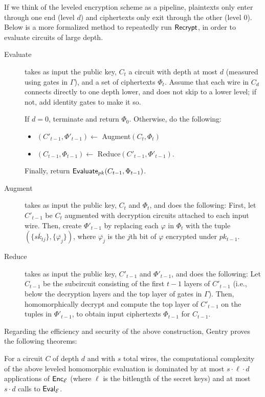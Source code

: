 If we think of the leveled encryption scheme as a pipeline, plaintexts only enter through one end (level $d$) and ciphertexts only exit through the other (level $0$). Below is a more formalized method to repeatedly run ${\sf Recrypt}$, in order to evaluate circuits of large depth.

\begin{description}
\item[Evaluate] takes as input the public key, $C_t$ a circuit with depth at most $d$ (measured using gates in $\Gamma$), and a set of ciphertexts $\Phi_t$. Assume that each wire in $C_d$ connects directly to one depth lower, and does not skip to a lower level; if not, add identity gates to make it so.

If $d=0$, terminate and return $\Phi_0$. Otherwise, do the following:
\begin{itemize}
\item $(C'_{t-1}, \Phi'_{t-1}) \leftarrow$ Augment$(C_t, \Phi_t)$
\item $(C_{t-1}, \Phi_{t-1}) \leftarrow$ Reduce$(C'_{t-1}, \Phi'_{t-1})$.
\end{itemize}

Finally, return ${\sf Evaluate}_{pk}(C_{t-1}, \Phi_{t-1})$.

\item[Augment] takes as input the public key, $C_t$ and $\Phi_t$, and does the following: First, let $C'_{t-1}$ be $C_t$ augmented with decryption circuits attached to each input wire. Then, create $\Phi'_{t-1}$ by replacing each $\varphi$ in $\Phi_t$ with the tuple $(\{\overline{sk_{tj}}\}, \{\overline{\varphi_j}\})$, where $\overline{\varphi_j}$ is the $j$th bit of $\varphi$ encrypted under $pk_{t-1}$.

\item[Reduce] takes as input the public key, $C'_{t-1}$ and $\Phi'_{t-1}$, and does the following: Let $C_{t-1}$ be the subcircuit consisting of the first $t-1$ layers of $C'_{t-1}$ (i.e., below the decryption layers and the top layer of gates in $\Gamma$). Then, homomorphically decrypt and compute the top layer of $C'_{t-1}$ on the tuples in $\Phi'_{t-1}$, to obtain input ciphertexts $\Phi_{t-1}$ for $C_{t-1}$.
\end{description}

Regarding the efficiency and security of the above construction, Gentry proves the following theorems:
\begin{theorem}
For a circuit $C$ of depth $d$ and with $s$ total wires, the computational complexity of the above leveled homomorphic evaluation is dominated by at most $s \cdot \ell \cdot d$ applications of ${\sf Enc}_\mathcal{E}$ (where $\ell$ is the bitlength of the secret keys) and at most $s \cdot d$ calls to ${\sf Eval}_\mathcal{E}$.
\end{theorem}

